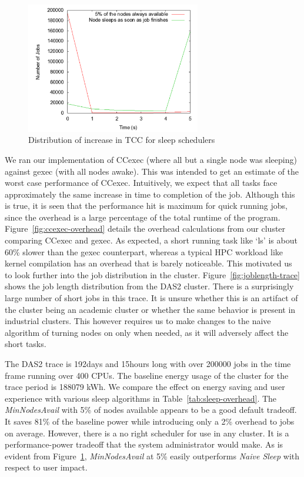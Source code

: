 \begin{figure}[ht]
\centering
\begin{center}
\includegraphics[width=3.0in]{graphs/overhead-time.pdf}
\vspace{-0.1in}
\caption{{\normalsize Distribution of increase in TCC for sleep schedulers}\label{fig:overhead-time}}
\vspace{-0.1in}
\end{center}
\end{figure}
We ran our implementation of CCexec (where all but a single node was sleeping) against gexec (with all nodes awake). This was intended to get an estimate of the worst case performance of CCexec. Intuitively, we expect that all tasks face approximately the same increase in time to completion of the job. Although this is true, it is seen that the performance hit is maximum for quick running jobs, since the overhead is a large percentage of the total runtime of the program. Figure~\ref{fig:ccexec-overhead} details the overhead calculations from our cluster comparing CCexec and gexec. As expected, a short running task like `ls' is about 60\% slower than the gexec counterpart, whereas a typical HPC workload like kernel compilation has an overhead that is barely noticeable. This motivated us to look further into the job distribution in the cluster. Figure~\ref{fig:joblength-trace} shows the job length distribution from the DAS2 cluster. There is a surprisingly large number of short jobs in this trace. It is unsure whether this is an artifact of the cluster being an academic cluster or whether the same behavior is present in industrial clusters. This however requires us to make changes to the naive algorithm of turning nodes on only when needed, as it will adversely affect the short tasks.

The DAS2 trace is 192days and 15hours long with over 200000 jobs in the time frame running over 400 CPUs. The baseline energy usage of the cluster for the trace period is 188079 kWh. We compare the effect on energy saving and user experience with various sleep algorithms in Table~\ref{tab:sleep-overhead}. The \emph{MinNodesAvail} with 5\% of nodes available appears to be a good default tradeoff. It saves 81\% of the baseline power while introducing only a 2\% overhead to jobs on average. However, there is a no right scheduler for use in any cluster. It is a performance-power tradeoff that the system administrator would make. As is evident from Figure~\ref{fig:overhead-time}, \emph{MinNodesAvail} at 5\% easily outperforms \emph{Naive Sleep} with respect to user impact.

